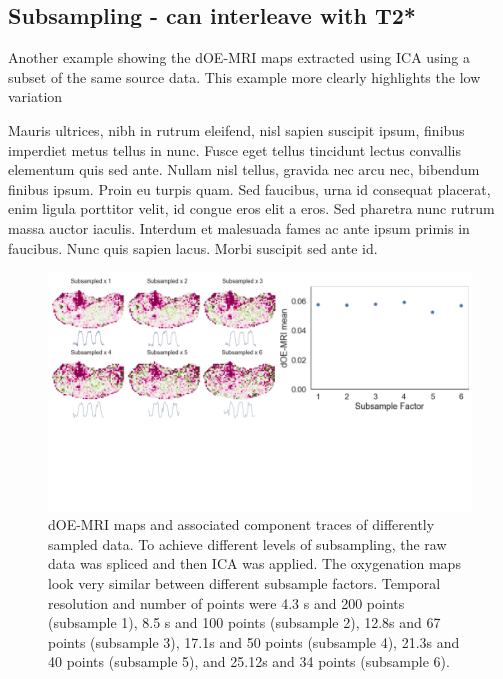 \subsection{Subsampling - can interleave with T2*}
\label{sec:interleave}
Another example showing the dOE-MRI maps extracted using ICA using a subset of the same source data.
This example more clearly highlights the low variation 


Mauris ultrices, nibh in rutrum eleifend, nisl sapien suscipit ipsum, finibus imperdiet metus tellus in nunc. Fusce eget tellus tincidunt lectus convallis elementum quis sed ante. Nullam nisl tellus, gravida nec arcu nec, bibendum finibus ipsum. Proin eu turpis quam. Sed faucibus, urna id consequat placerat, enim ligula porttitor velit, id congue eros elit a eros. Sed pharetra nunc rutrum massa auctor iaculis. Interdum et malesuada fames ac ante ipsum primis in faucibus. Nunc quis sapien lacus. Morbi suscipit sed ante id.

\begin{figure}[htbp]
   \centering
   \includegraphics[width=\textwidth]{oemri_thesis1/oemri_thesis1-images/technical_subsample.pdf} %
   \caption{dOE-MRI maps and associated component traces of differently sampled data. To achieve different levels of subsampling, the raw data was spliced and then ICA was applied. The oxygenation maps look very similar between different subsample factors. Temporal resolution and number of points were 4.3 s and 200 points (subsample 1), 8.5 s and 100 points (subsample 2), 12.8s and 67 points (subsample 3), 17.1s and 50 points (subsample 4), 21.3s and 40 points (subsample 5), and 25.12s and 34 points (subsample 6).}
   \label{subSample}
\end{figure}

\endinput
